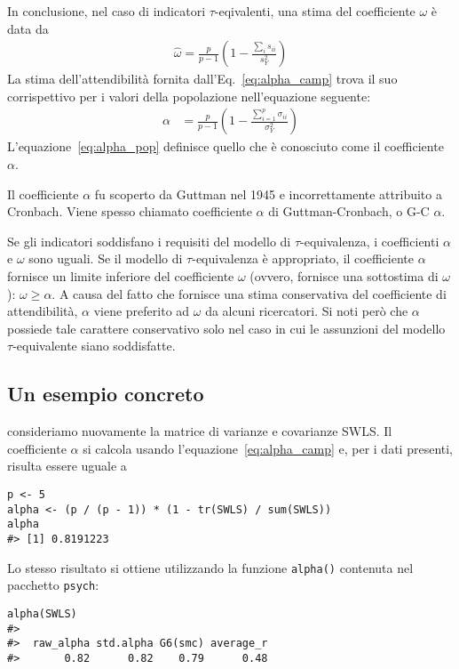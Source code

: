 \noindent
 In conclusione, nel caso di indicatori $\tau$-eqivalenti, una stima del coefficiente $\omega$ è data da
\begin{align}
\hat{\omega} 
 = \frac{p}{p-1}\left(1-\frac{\sum_i s_{ii}}{s_Y^2}\right)
\label{eq:alpha_camp}
\end{align}
La stima dell'attendibilità fornita dall'Eq.~\ref{eq:alpha_camp}
  trova il suo corrispettivo per i valori della popolazione
  nell'equazione seguente:
\begin{align}
\alpha &= \frac{p}{p-1}\left(1-\frac{\sum_{i=1}^p
    \sigma_{ii}}{\sigma_Y^2}\right) 
\label{eq:alpha_pop}
\end{align} 
L'equazione~\ref{eq:alpha_pop} definisce quello che è conosciuto come il
coefficiente $\alpha$.  

Il coefficiente $\alpha$ fu scoperto da
Guttman nel 1945 e incorrettamente attribuito a Cronbach. Viene spesso
chiamato coefficiente $\alpha$ di Guttman-Cronbach, o G-C $\alpha$.

Se gli indicatori soddisfano i requisiti del modello di
$\tau$-equivalenza, i coefficienti $\alpha$ e $\omega$ sono uguali.
Se il modello di $\tau$-equivalenza è appropriato, il coefficiente
$\alpha$ fornisce un limite inferiore del coefficiente
$\omega$ (ovvero, fornisce una sottostima di $\omega$):
$
\omega \geq \alpha
$. 
A causa del fatto che fornisce una stima conservativa del
coefficiente di attendibilità, $\alpha$ viene preferito ad $\omega$ da
alcuni ricercatori. Si noti però che $\alpha$ possiede tale carattere conservativo solo nel caso in cui le assunzioni del modello $\tau$-equivalente siano soddisfatte. 


\subsection{Un esempio concreto}

 consideriamo nuovamente la matrice di varianze e covarianze
  SWLS. 
Il coefficiente $\alpha$ si calcola usando l'equazione~\ref{eq:alpha_camp} 
e, per i dati presenti, risulta essere uguale a
\begin{lstlisting}
p <- 5
alpha <- (p / (p - 1)) * (1 - tr(SWLS) / sum(SWLS))   
alpha
#> [1] 0.8191223
\end{lstlisting} 
Lo stesso risultato si ottiene utilizzando la funzione {\tt alpha()} contenuta nel pacchetto {\tt psych}:
\begin{lstlisting}
alpha(SWLS)
#> 
#>  raw_alpha std.alpha G6(smc) average_r
#>       0.82      0.82    0.79      0.48
\end{lstlisting} 

